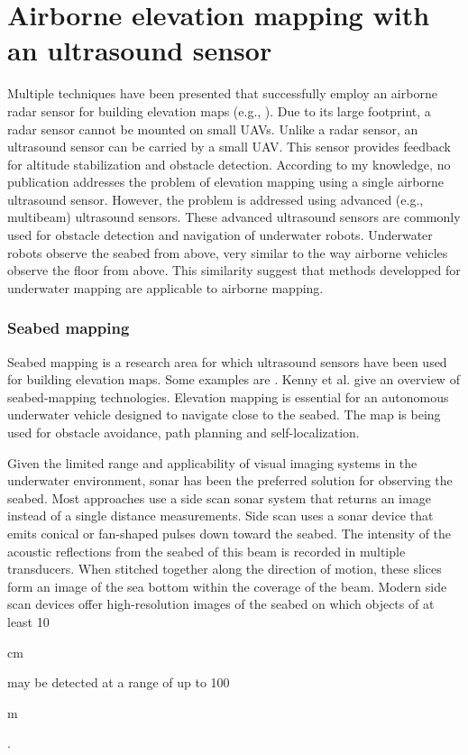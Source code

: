 \section{Airborne elevation mapping with an ultrasound sensor}
\label{sec:related-research-elevation-mapping}
Multiple techniques have been presented that successfully employ an airborne radar sensor for building elevation maps (e.g., \cite{foessel2000radar, weiß2006airborne}).
Due to its large footprint, a radar sensor cannot be mounted on small UAVs.
Unlike a radar sensor, an ultrasound sensor can be carried by a small UAV.
This sensor provides feedback for altitude stabilization and obstacle detection.
According to my knowledge, no publication addresses the problem of elevation mapping using a single airborne ultrasound sensor.
However, the problem is addressed using advanced (e.g., multibeam) ultrasound sensors.
These advanced ultrasound sensors are commonly used for obstacle detection and navigation of underwater robots.
Underwater robots observe the seabed from above, very similar to the way airborne vehicles observe the floor from above.
This similarity suggest that methods developped for underwater mapping are applicable to airborne mapping.

\subsubsection{Seabed mapping}
Seabed mapping is a research area for which ultrasound sensors have been used for building elevation maps. Some examples are \cite{johnson1996seafloor,strauss1999multibeam,zerr1996three,evans2002three}.
Kenny et al. \cite{kenny2003overview} give an overview of seabed-mapping technologies.
Elevation mapping is essential for an autonomous underwater vehicle designed to navigate close to the seabed.
The map is being used for obstacle avoidance, path planning and self-localization.

Given the limited range and applicability of visual imaging systems in the underwater environment,
sonar has been the preferred solution \cite{blondel1997handbook} for observing the seabed.
Most approaches use a side scan sonar system that returns an image instead of a single distance measurements.
Side scan uses a sonar device that emits conical or fan-shaped pulses down toward the seabed.
The intensity of the acoustic reflections from the seabed of this beam is recorded in multiple transducers.
When stitched together along the direction of motion, these slices form an image of the sea bottom within the coverage of the beam.
Modern side scan devices offer high-resolution images of the seabed on which objects of at least 10\begin{small}cm\end{small} may be detected at a range of up to 100\begin{small}m\end{small}.

